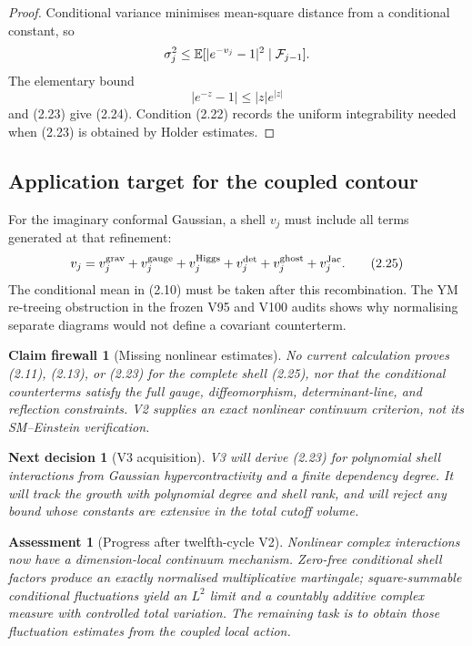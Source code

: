 \documentclass[11pt]{article}
\newtheorem{firewall}[theorem]{Claim firewall}
\newtheorem{decision}[theorem]{Next decision}
\newtheorem{assessment}[theorem]{Assessment}
\theoremstyle{remark}
\begin{document}
\begin{proof}
Conditional variance minimises mean-square distance from a
conditional constant, so
\[
 \sigma_j^2
 \le\mathbb E[|e^{-v_j}-1|^2\mid{\cal F}_{j-1}].
\]
The elementary bound
\[
                              |e^{-z}-1|\le|z|e^{|z|}
\]
and (2.23) give (2.24).  Condition (2.22) records the uniform
integrability needed when (2.23) is obtained by Holder estimates.
\end{proof}

\subsection{Application target for the coupled contour}

For the imaginary conformal Gaussian, a shell \(v_j\) must include
all terms generated at that refinement:
\[
 v_j=v_j^{\rm grav}+v_j^{\rm gauge}+v_j^{\rm Higgs}
      +v_j^{\rm det}+v_j^{\rm ghost}+v_j^{\rm Jac}.          \tag{2.25}
\]
The conditional mean in (2.10) must be taken after this recombination.
The YM re-treeing obstruction in the frozen V95 and V100 audits shows
why normalising separate diagrams would not define a covariant
counterterm.

\begin{firewall}[Missing nonlinear estimates]
\label{fire:v12v2-boundary}
No current calculation proves (2.11), (2.13), or (2.23) for the
complete shell (2.25), nor that the conditional counterterms satisfy
the full gauge, diffeomorphism, determinant-line, and reflection
constraints.  V2 supplies an exact nonlinear continuum criterion,
not its SM--Einstein verification.
\end{firewall}

\begin{decision}[V3 acquisition]
\label{dec:v12v2-next}
V3 will derive (2.23) for polynomial shell interactions from Gaussian
hypercontractivity and a finite dependency degree.  It will track the
growth with polynomial degree and shell rank, and will reject any
bound whose constants are extensive in the total cutoff volume.
\end{decision}

\begin{assessment}[Progress after twelfth-cycle V2]
\label{ass:v12v2-status}
Nonlinear complex interactions now have a dimension-local continuum
mechanism.  Zero-free conditional shell factors produce an exactly
normalised multiplicative martingale; square-summable conditional
fluctuations yield an \(L^2\) limit and a countably additive complex
measure with controlled total variation.  The remaining task is to
obtain those fluctuation estimates from the coupled local action.
\end{assessment}
\end{document}

